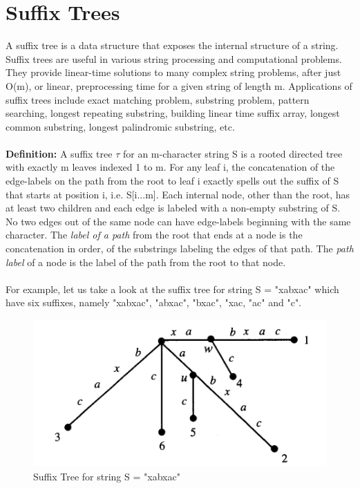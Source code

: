 \documentclass[11pt,a4paper]{article}
\begin{document}

\section{Suffix Trees}
\label{sec:introduction}
A suffix tree is a data structure that exposes the internal structure of a string. Suffix trees are useful in various string processing and computational problems. They provide linear-time solutions to many complex string problems, after just O(m), or linear, preprocessing time for a given string of length m. Applications of suffix trees include exact matching problem, substring problem, pattern searching, longest repeating substring, building linear time suffix array, longest common substring, longest palindromic substring, etc.
\\
\\
\textbf{Definition:} A suffix tree \begin{math}\tau\end{math} for an m-character string S is a rooted directed tree with exactly m leaves indexed 1 to m. For any leaf i, the concatenation of the edge-labels on the path from the root to leaf i exactly spells out the suffix of S that starts at position i, i.e. S[i...m]. Each internal node, other than the root, has at least two children and each edge is labeled with a non-empty substring of S. No two edges out of the same node can have edge-labels beginning with the same character.
The \emph{label of a path} from the root that ends at a node is the concatenation in order, of the substrings labeling the edges of that path. The \emph{path label} of a node is the label of the path from the root to that node.
\\
\\
For example, let us take a look at the suffix tree for string S = "xabxac" which have six suffixes, namely "xabxac", "abxac", "bxac", "xac, "ac" and "c".
\begin{figure}[H]
    \centering
    \includegraphics{Images/image1.png}
    \caption{Suffix Tree for string S = "xabxac"}
    \label{fig:suffixtreeExample}
\end{figure}
\end{document}
